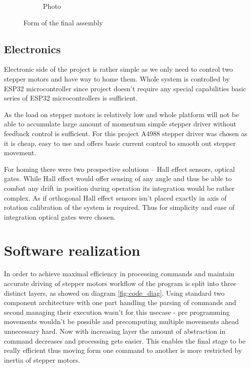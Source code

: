 \begin{figure}[h!]
\begin{subfigure}[b]{0.45\textwidth}
    \caption{Photo}
  \end{subfigure}
  \caption{Form of the final assembly}
  \label{fig:side_by_side}
\end{figure}

\section{Electronics}

Electronic side of the project is rather simple as we only need to control two stepper motors and have way to home them.
Whole system is controlled by ESP32 microcontroller since project doesn't require any special capabilities basic series of ESP32 microcontrollers is sufficient.

As the load on stepper motors is relatively low and whole platform will not be able to accumulate large amount of momentum simple stepper driver without feedback control is sufficient.
For this project A4988 stepper driver was chosen as it is cheap, easy to use and offers basic current control to smooth out stepper movement\cite{a4988}.

For homing  there were two prospective solutions -- Hall effect sensors, optical gates.
While Hall effect would offer sensing of any angle and thus be able to combat any drift in position during operation its integration would be rather complex.
As if orthogonal Hall effect sensors isn't placed exactly in axis of rotation calibration of the system is required\cite{hall}.
Thus for simplicity and ease of integration optical gates were chosen.


\chapter{Software realization}

In order to achieve maximal efficiency in processing commands and  maintain accurate driving of stepper motors workflow of the program is split into three distinct layers, as showed on diagram \ref{fig:code_diag}.
Using standard two component architecture with one part handling the parsing of commands and second managing their execution wasn't for this usecase - pre programming movements wouldn't be possible and precomputing multiple movements ahead unnecessary hard.
Now with increasing layer the amount of abstraction in command decreases and processing gets easier.
This enables the final stage to be really efficient thus moving form one command to another is more restricted by inertia of stepper motors.

